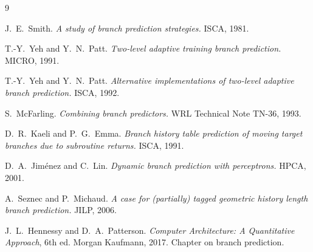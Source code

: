 \documentclass[10pt]{article}
\begin{document}
\begin{thebibliography}{9}

J.~E.~Smith.
\emph{A study of branch prediction strategies.}
ISCA, 1981.

T.-Y.~Yeh and Y.~N.~Patt.
\emph{Two-level adaptive training branch prediction.}
MICRO, 1991.

T.-Y.~Yeh and Y.~N.~Patt.
\emph{Alternative implementations of two-level adaptive branch
prediction.}
ISCA, 1992.

S.~McFarling.
\emph{Combining branch predictors.}
WRL Technical Note TN-36, 1993.

D.~R.~Kaeli and P.~G.~Emma.
\emph{Branch history table prediction of moving target branches due
to subroutine returns.}
ISCA, 1991.

D.~A.~Jim\'enez and C.~Lin.
\emph{Dynamic branch prediction with perceptrons.}
HPCA, 2001.

A.~Seznec and P.~Michaud.
\emph{A case for (partially) tagged geometric history length branch
prediction.}
JILP, 2006.

J.~L.~Hennessy and D.~A.~Patterson.
\emph{Computer Architecture: A Quantitative Approach}, 6th ed.
Morgan Kaufmann, 2017. Chapter on branch prediction.

\end{thebibliography}
\end{document}
